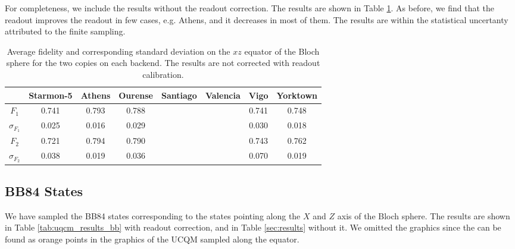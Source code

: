For completeness, we include the results without the readout correction. The results are shown in Table \ref{tab:uqcm_results_eq_non}. As before, we find that the readout improves the readout in few cases, e.g. Athens, and it decreases in most of them. The results are within the statistical uncertanty attributed to the finite sampling.

\begin{table}[H]
    \centering
    \begin{tabular}{|c|c|c|c|c|c|c|c|}
    \hline
    \textbf{} & \textbf{Starmon-5} & \textbf{Athens} & \textbf{Ourense} & \textbf{Santiago} & \textbf{Valencia} & \textbf{Vigo} & \textbf{Yorktown} \\ \hline
    $F_1$              & 0.741 & 0.793 & 0.788 &  &  & 0.741 & 0.748\\ \hline
    $\sigma_{F_1}$     & 0.025 & 0.016 & 0.029 &  &  & 0.030 & 0.018 \\ \hline
    $F_2$              & 0.721 & 0.794 & 0.790 &  &  & 0.743 & 0.762 \\ \hline
    $\sigma_{F_2}$     & 0.038 & 0.019 & 0.036 &  &  & 0.070 & 0.019 \\ \hline
    \end{tabular}
    \caption{Average fidelity and corresponding standard deviation on the $xz$ equator of the Bloch sphere for the two copies on each backend. The results are not corrected with readout calibration.}\label{tab:uqcm_results_eq_non}
\end{table}

\subsection{BB84 States}

We have sampled the BB84 states corresponding to the states pointing along the $X$ and $Z$ axis of the Bloch sphere. The results are shown in Table \ref{tab:uqcm_results_bb} with readout correction, and in Table \ref{sec:results} without it. We omitted the graphics since the can be found as orange points in the graphics of the UCQM sampled along the equator.

